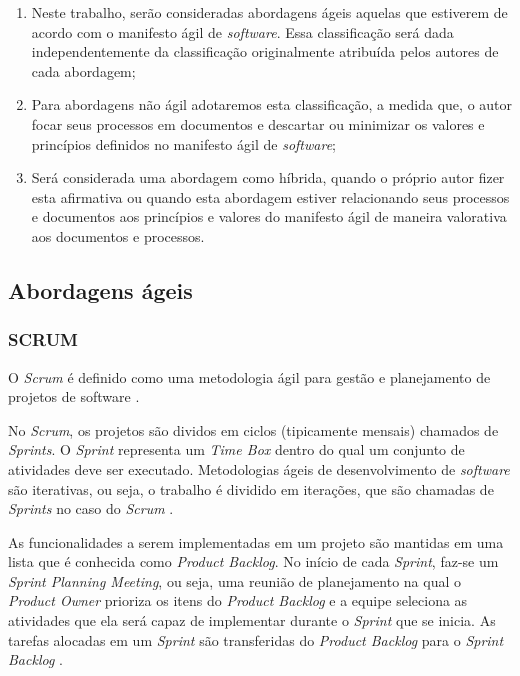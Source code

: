 \documentclass{acm_proc_article-sp}
\begin{document}
\begin{enumerate}
\item  Neste trabalho, serão consideradas abordagens ágeis aquelas que estiverem de acordo com o manifesto ágil de \textit{software}. Essa classificação será dada independentemente da classificação originalmente atribuída pelos autores de cada abordagem;
\item Para abordagens não ágil adotaremos esta classificação, a medida que, o autor focar seus processos em documentos e descartar ou minimizar os valores e princípios definidos no manifesto ágil de \textit{software};
\item Será considerada uma abordagem como híbrida, quando o próprio autor fizer esta afirmativa ou quando esta abordagem estiver relacionando seus processos e documentos aos princípios e valores do manifesto ágil de maneira valorativa aos documentos e processos.
\end{enumerate}

\subsection{Abordagens ágeis}

\subsubsection{SCRUM}
O \textit{Scrum} é definido como uma metodologia ágil para gestão e planejamento de projetos de software \cite{scrum:agil}.

No \textit{Scrum}, os projetos são dividos em ciclos (tipicamente mensais) chamados de \textit{Sprints}. O \textit{Sprint} representa um \textit{Time Box} dentro do qual um conjunto de atividades deve ser executado. Metodologias ágeis de desenvolvimento de \textit{software} são iterativas, ou seja, o trabalho é dividido em iterações, que são chamadas de \textit{Sprints} no caso do \textit{Scrum} \cite{scrum:agil}.

As funcionalidades a serem implementadas em um projeto são mantidas em uma lista que é conhecida como \textit{Product Backlog}. No início de cada \textit{Sprint}, faz-se um \textit{Sprint Planning Meeting}, ou seja, uma reunião de planejamento na qual o \textit{Product Owner} prioriza os itens do \textit{Product Backlog} e a equipe seleciona as atividades que ela será capaz de implementar durante o \textit{Sprint} que se inicia. As tarefas alocadas em um \textit{Sprint} são transferidas do \textit{Product Backlog} para o \textit{Sprint Backlog} \cite{scrum:agil}.
\end{document}
